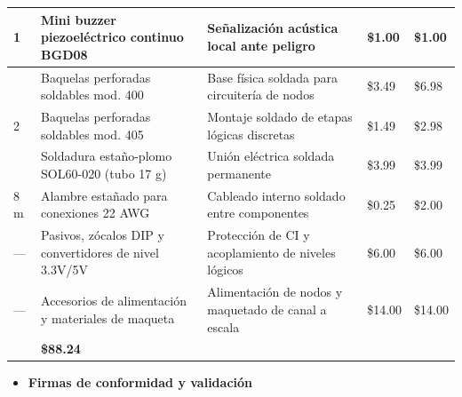 \documentclass[11pt,letterpaper]{article}
\begin{document}
\begin{tabularx}{\linewidth}{|>{\centering\arraybackslash}p{0.75cm}|>{\raggedright\arraybackslash}X|>{\raggedright\arraybackslash}X|>{\centering\arraybackslash}p{1.75cm}|>{\centering\arraybackslash}p{1.75cm}|}
  \hline
  \rowcolor{tablerowalt}
  1 & Mini buzzer piezoeléctrico continuo BGD08 & Señalización acústica local ante peligro & \$1.00 & \$1.00 \\
  \hline
  2 & Baquelas perforadas soldables mod. 400 & Base física soldada para circuitería de nodos & \$3.49 & \$6.98 \\
  \hline
  \rowcolor{tablerowalt}
  2 & Baquelas perforadas soldables mod. 405 & Montaje soldado de etapas lógicas discretas & \$1.49 & \$2.98 \\
  \hline
  1 & Soldadura estaño-plomo SOL60-020 (tubo 17 g) & Unión eléctrica soldada permanente & \$3.99 & \$3.99 \\
  \hline
  \rowcolor{tablerowalt}
  8 m & Alambre estañado para conexiones 22 AWG & Cableado interno soldado entre componentes & \$0.25 & \$2.00 \\
  \hline
  --- & Pasivos, zócalos DIP y convertidores de nivel 3.3V/5V & Protección de CI y acoplamiento de niveles lógicos & \$6.00 & \$6.00 \\
  \hline
  \rowcolor{tablerowalt}
  --- & Accesorios de alimentación y materiales de maqueta & Alimentación de nodos y maquetado de canal a escala & \$14.00 & \$14.00 \\
  \hline
  \rowcolor{tableheadergray}
  \multicolumn{4}{|l|}{\textbf{TOTAL}} & \textbf{\$88.24} \\
  \hline
\end{tabularx}%
\endgroup

\clearpage


\begin{itemize}[leftmargin=1.5em,itemsep=0.2em,topsep=0.1em]
  \item \textbf{Firmas de conformidad y validación}
\end{itemize}
\end{document}
